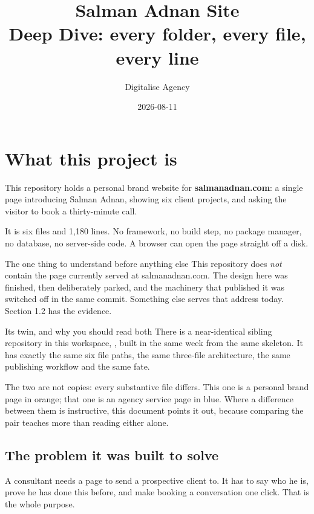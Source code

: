 \documentclass[11pt,a4paper]{article}
\title{Salman Adnan Site\\[2mm]\large Deep Dive: every folder, every file, every line}
\author{Digitalise Agency}
\date{2026-08-11}
\begin{document}
\maketitle
\tableofcontents
\newpage

\section{What this project is}

This repository holds a personal brand website for \textbf{salmanadnan.com}: a
single page introducing Salman Adnan, showing six client projects, and asking the
visitor to book a thirty-minute call.

It is six files and 1{,}180 lines. No framework, no build step, no package
manager, no database, no server-side code. A browser can open the page straight
off a disk.

\begin{keyidea}{The one thing to understand before anything else}
This repository does \emph{not} contain the page currently served at
salmanadnan.com. The design here was finished, then deliberately parked, and the
machinery that published it was switched off in the same commit. Something else
serves that address today. Section 1.2 has the evidence.
\end{keyidea}

\begin{keyidea}{Its twin, and why you should read both}
There is a near-identical sibling repository in this workspace,
, built in the same week from the same skeleton. It has
exactly the same six file paths, the same three-file architecture, the same
publishing workflow and the same fate.

The two are not copies: every substantive file differs. This one is a personal
brand page in orange; that one is an agency service page in blue. Where a
difference between them is instructive, this document points it out, because
comparing the pair teaches more than reading either alone.
\end{keyidea}

\subsection{The problem it was built to solve}

A consultant needs a page to send a prospective client to. It has to say who he
is, prove he has done this before, and make booking a conversation one click.
That is the whole purpose.
\end{document}
